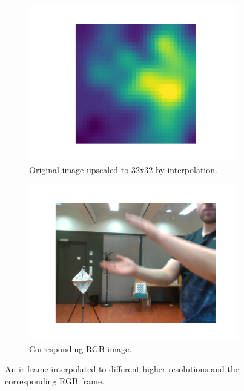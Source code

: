 \begin{figure}[H]
\begin{subfigure}[b]{0.475\textwidth}
        \centering
        \includegraphics[width=\textwidth]{fig/4/ir32.pdf}
        \caption{Original image upscaled to 32x32 by interpolation.}
        \label{fig:ir-interp-4x}
    \end{subfigure}
    \hfill
    \begin{subfigure}[b]{0.475\textwidth}
        \centering
        \includegraphics[width=\textwidth]{fig/4/ir-rgb.pdf}
        \caption{Corresponding RGB image.}
        \label{fig:ir-rgb}
    \end{subfigure}
    \caption{An \gls{ir} frame interpolated to different higher resolutions and the corresponding RGB frame.}
    \label{fig:ir-interpolated}
\end{figure}

